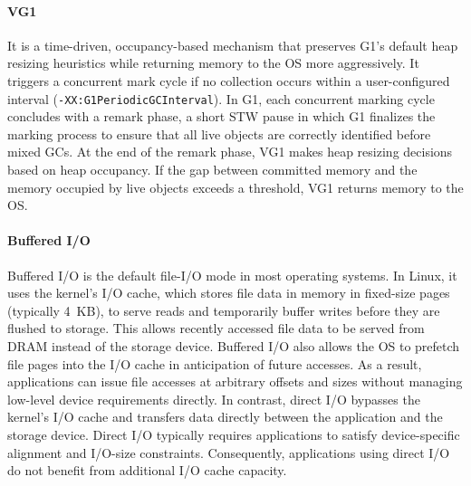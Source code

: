 \paragraph{\textbf{VG1}}
It is a time-driven, occupancy-based mechanism that preserves G1's default heap resizing heuristics while returning memory to the OS more aggressively.
It triggers a concurrent mark cycle if no collection occurs within a user-configured interval (\texttt{-XX:G1PeriodicGCInterval}).
In G1, each concurrent marking cycle concludes with a remark phase, a short STW pause in which G1 finalizes the marking process to ensure that all live objects are correctly identified before mixed GCs.
At the end of the remark phase, VG1 makes heap resizing decisions based on heap occupancy.
If the gap between committed memory and the memory occupied by live objects exceeds a threshold, VG1 returns memory to the OS.

\paragraph{\textbf{Buffered I/O}}
Buffered I/O is the default file-I/O mode in most operating systems.
In Linux, it uses the kernel's I/O cache, which stores file data in memory in fixed-size pages (typically \SI{4}{KB}), to serve reads and temporarily buffer writes before they are flushed to storage.
This allows recently accessed file data to be served from DRAM instead of the storage device.
Buffered I/O also allows the OS to prefetch file pages into the I/O cache in anticipation of future accesses.
As a result, applications can issue file accesses at arbitrary offsets and sizes without managing low-level device requirements directly.
In contrast, direct I/O bypasses the kernel's I/O cache and transfers data directly between the application and the storage device.
Direct I/O typically requires applications to satisfy device-specific alignment and I/O-size constraints.
Consequently, applications using direct I/O do not benefit from additional I/O cache capacity.
